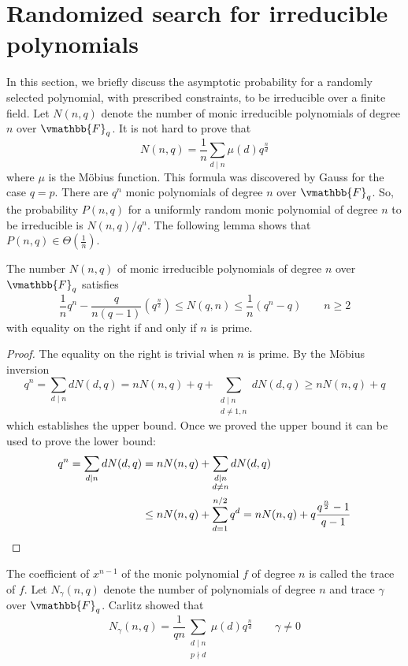 \section{Randomized search for irreducible polynomials}
\label{section:r-s-irr-poly}

In this section, we briefly discuss the asymptotic probability for a randomly selected polynomial, 
with prescribed constraints, to be irreducible over a finite field. Let $N(n, q)$ denote the number 
of monic irreducible polynomials of degree $n$ over $\vmathbb{F}_q$. It is not hard to prove that 
$$
N(n, q) = \frac{1}{n}\sum_{d \mid n}\mu(d)q^{\frac{n}{d}}
$$
where $\mu$ is the M\"obius function. This formula was discovered by Gauss \cite{Gauss1981} for the 
case $q = p$. There are $q^n$ monic polynomials of degree $n$ over $\vmathbb{F}_q$. So, the 
probability $P(n, q)$ for a uniformly random monic polynomial of degree $n$ to be irreducible is 
$N(n, q) / q^n$. The following lemma shows that $P(n, q) \in \Theta(\frac{1}{n})$.
\begin{lemma}
The number $N(n, q)$ of monic irreducible polynomials of degree $n$ over $\vmathbb{F}_q$ satisfies
$$
\frac{1}{n}q^n - \frac{q}{n(q - 1)}(q^{\frac{n}{2}}) \le N(q, n) \le \frac{1}{n}(q^n - q) \qquad n 
\ge 2
$$
with equality on the right if and only if $n$ is prime.
\end{lemma}
\begin{proof}
The equality on the right is trivial when $n$ is prime. By the M\"obius inversion 
$$
q^n = \sum_{d \mid n}dN(d, q) = nN(n, q) + q + \sum_{\substack{d \mid n \\ d \ne 1, n}}dN(d, q) \ge 
nN(n, q) + q
$$
which establishes the upper bound. Once we proved the upper bound it can be used to prove the lower 
bound:
\begin{align*}
q^n = \sum_{d \mid n}dN(d, q) 
&= nN(n, q) + \sum_{\substack{d \mid n \\ d \ne n}}dN(d, q) \\
&\le nN(n, q) + \sum_{d = 1}^{n / 2} q^d = nN(n, q) + q \frac{q^{\frac{n}{2}} - 1}{q - 1} \qedhere
\end{align*}
\end{proof}
The coefficient of $x^{n - 1}$ of the monic polynomial $f$ of degree $n$ is called the trace of $f$. 
Let $N_\gamma(n, q)$ denote the number of polynomials of degree $n$ and trace $\gamma$ over 
$\vmathbb{F}_q$. Carlitz \cite{Carlitz1952} showed that
$$
N_\gamma(n, q) = \frac{1}{qn}\sum_{\substack{d \mid n \\ p \nmid d}} \mu(d)q^{\frac{n}{d}} \qquad 
\gamma \ne 0
$$
